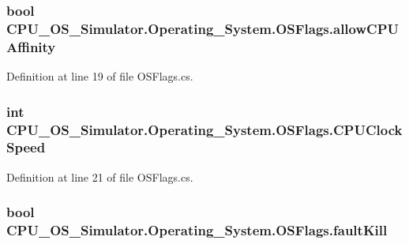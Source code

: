 \subsubsection[{allow\+C\+P\+U\+Affinity}]{\setlength{\rightskip}{0pt plus 5cm}bool C\+P\+U\+\_\+\+O\+S\+\_\+\+Simulator.\+Operating\+\_\+\+System.\+O\+S\+Flags.\+allow\+C\+P\+U\+Affinity}\label{struct_c_p_u___o_s___simulator_1_1_operating___system_1_1_o_s_flags_ac1d1812ad9ef56ccadacb19831d2e92d}


Definition at line 19 of file O\+S\+Flags.\+cs.

\hypertarget{struct_c_p_u___o_s___simulator_1_1_operating___system_1_1_o_s_flags_a51541aa57e2e3114e111faff27a5d4cd}{}
\subsubsection[{C\+P\+U\+Clock\+Speed}]{\setlength{\rightskip}{0pt plus 5cm}int C\+P\+U\+\_\+\+O\+S\+\_\+\+Simulator.\+Operating\+\_\+\+System.\+O\+S\+Flags.\+C\+P\+U\+Clock\+Speed}\label{struct_c_p_u___o_s___simulator_1_1_operating___system_1_1_o_s_flags_a51541aa57e2e3114e111faff27a5d4cd}


Definition at line 21 of file O\+S\+Flags.\+cs.

\hypertarget{struct_c_p_u___o_s___simulator_1_1_operating___system_1_1_o_s_flags_ab6e0543edd30b393255293bccf19c9d1}{}
\subsubsection[{fault\+Kill}]{\setlength{\rightskip}{0pt plus 5cm}bool C\+P\+U\+\_\+\+O\+S\+\_\+\+Simulator.\+Operating\+\_\+\+System.\+O\+S\+Flags.\+fault\+Kill}\label{struct_c_p_u___o_s___simulator_1_1_operating___system_1_1_o_s_flags_ab6e0543edd30b393255293bccf19c9d1}


